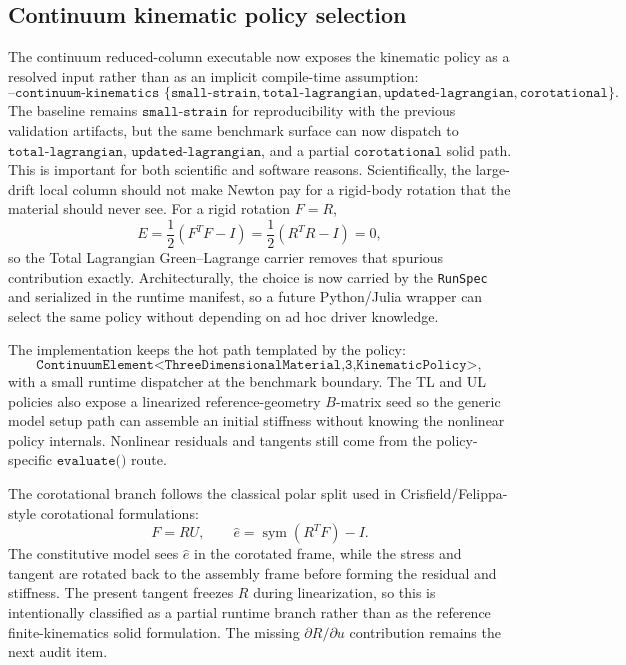 \subsection{Continuum kinematic policy selection}

The continuum reduced-column executable now exposes the kinematic policy as a
resolved input rather than as an implicit compile-time assumption:
\[
\texttt{--continuum-kinematics }
\{\texttt{small-strain},\texttt{total-lagrangian},
\texttt{updated-lagrangian},\texttt{corotational}\}.
\]
The baseline remains \(\texttt{small-strain}\) for reproducibility with the
previous validation artifacts, but the same benchmark surface can now dispatch
to \(\texttt{total-lagrangian}\), \(\texttt{updated-lagrangian}\), and a
partial \(\texttt{corotational}\) solid path. This is important for both
scientific and software reasons. Scientifically, the
large-drift local column should not make Newton pay for a rigid-body rotation
that the material should never see. For a rigid rotation \(F=R\),
\[
    E = \frac{1}{2}(F^T F-I)
      = \frac{1}{2}(R^T R-I)
      = 0,
\]
so the Total Lagrangian Green--Lagrange carrier removes that spurious
contribution exactly. Architecturally, the choice is now carried by the
\texttt{RunSpec} and serialized in the runtime manifest, so a future
Python/Julia wrapper can select the same policy without depending on ad hoc
driver knowledge.

The implementation keeps the hot path templated by the policy:
\[
\texttt{ContinuumElement<ThreeDimensionalMaterial,3,KinematicPolicy>},
\]
with a small runtime dispatcher at the benchmark boundary. The TL and UL
policies also expose a linearized reference-geometry \(B\)-matrix seed so the
generic model setup path can assemble an initial stiffness without knowing the
nonlinear policy internals. Nonlinear residuals and tangents still come from
the policy-specific \(\texttt{evaluate()}\) route.

The corotational branch follows the classical polar split used in
Crisfield/Felippa-style corotational formulations:
\[
    F = R U,\qquad
    \hat e = \operatorname{sym}(R^T F)-I.
\]
The constitutive model sees \(\hat e\) in the corotated frame, while the stress
and tangent are rotated back to the assembly frame before forming the residual
and stiffness. The present tangent freezes \(R\) during linearization, so this
is intentionally classified as a partial runtime branch rather than as the
reference finite-kinematics solid formulation. The missing
\(\partial R/\partial u\) contribution remains the next audit item.

